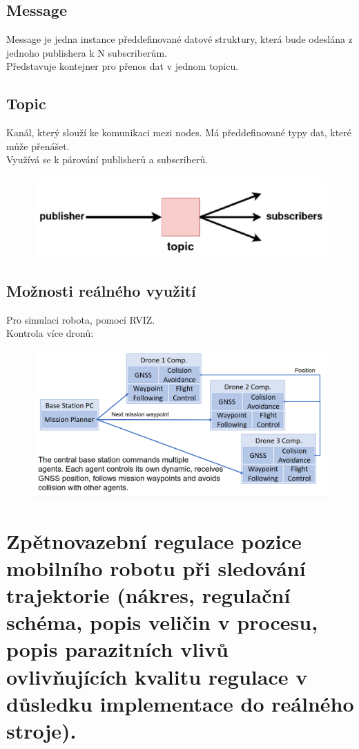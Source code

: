 \subsection{Message}
Message je jedna instance předdefinované datové struktury, která bude odeslána z jednoho publishera k N subscriberům.\\
Představuje kontejner pro přenos dat v jednom topicu.\\
\subsection{Topic}
Kanál, který slouží ke komunikaci mezi nodes. Má předdefinované typy dat, které může přenášet.\\
Využívá se k párování publisherů a subscriberů.\\
\begin{figure}[h!]
    \centering
    \includegraphics[scale = 0.3]{img/Topic.png}
\end{figure}

\subsection{Možnosti reálného využití}
Pro simulaci robota, pomocí RVIZ.\\
Kontrola více dronů:
\begin{figure}[h!
    ]
    \centering
    \includegraphics[scale = 0.3]{img/ROSControl.png}
\end{figure}
\section{Zpětnovazební regulace pozice mobilního robotu při sledování trajektorie (nákres, regulační schéma, popis veličin v procesu, popis parazitních vlivů ovlivňujících kvalitu regulace v důsledku implementace do reálného stroje).}

